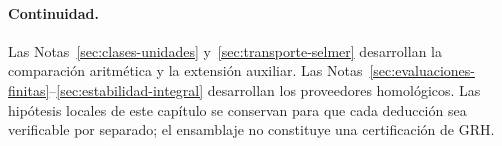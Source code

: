 \paragraph{Continuidad.} Las Notas~\ref{sec:clases-unidades} y~\ref{sec:transporte-selmer} desarrollan la comparación aritmética y la extensión auxiliar. Las Notas~\ref{sec:evaluaciones-finitas}--\ref{sec:estabilidad-integral} desarrollan los proveedores homológicos. Las hipótesis locales de este capítulo se conservan para que cada deducción sea verificable por separado; el ensamblaje no constituye una certificación de GRH.